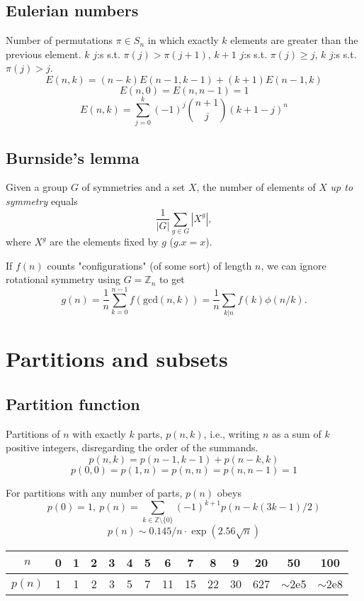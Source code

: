 	\subsection{Eulerian numbers}
		Number of permutations $\pi \in S_n$ in which exactly $k$ elements are greater than the previous element. $k$ $j$:s s.t. $\pi(j)>\pi(j+1)$, $k+1$ $j$:s s.t. $\pi(j)\geq j$, $k$ $j$:s s.t. $\pi(j)>j$.
		$$E(n,k) = (n-k)E(n-1,k-1) + (k+1)E(n-1,k)$$
		$$E(n,0) = E(n,n-1) = 1$$
		$$E(n,k) = \sum_{j=0}^k(-1)^j\binom{n+1}{j}(k+1-j)^n$$

	\subsection{Burnside's lemma}
		Given a group $G$ of symmetries and a set $X$, the number of elements of $X$ \emph{up to symmetry} equals
		 \[ {\frac {1}{|G|}}\sum _{{g\in G}}|X^{g}|, \]
		 where $X^{g}$ are the elements fixed by $g$ ($g.x = x$).

		 If $f(n)$ counts "configurations" (of some sort) of length $n$, we can ignore rotational symmetry using $G = \mathbb Z_n$ to get
		 \[ g(n) = \frac 1 n \sum_{k=0}^{n-1}{f(\text{gcd}(n, k))} = \frac 1 n \sum_{k|n}{f(k)\phi(n/k)}. \]

\section{Partitions and subsets}
	\subsection{Partition function}
		Partitions of $n$ with exactly $k$ parts, $p(n,k)$, i.e., writing $n$ as a sum of $k$ positive integers, disregarding the order of the summands.
		$$p(n,k) = p(n-1,k-1)+p(n-k,k)$$
		$$p(0,0)=p(1,n)=p(n,n)=p(n,n-1)=1$$

		For partitions with any number of parts, $p(n)$ obeys
		\[ p(0) = 1,\ p(n) = \sum_{k \in \mathbb Z \setminus \{0\}}{(-1)^{k+1} p(n - k(3k-1) / 2)} \]
		\[ p(n) \sim 0.145 / n \cdot \exp(2.56 \sqrt{n}) \]

		\begin{center}
		\begin{tabular}{c|c@{\ }c@{\ }c@{\ }c@{\ }c@{\ }c@{\ }c@{\ }c@{\ }c@{\ }c@{\ }c@{\ }c@{\ }c}
			$n$    & 0 & 1 & 2 & 3 & 4 & 5 & 6  & 7  & 8  & 9  & 20  & 50  & 100 \\ \hline
			$p(n)$ & 1 & 1 & 2 & 3 & 5 & 7 & 11 & 15 & 22 & 30 & 627 & $\mathtt{\sim}$2e5 & $\mathtt{\sim}$2e8 \\
		\end{tabular}
		\end{center}

